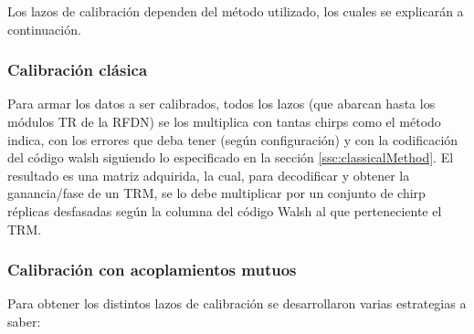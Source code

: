 Los lazos de calibración dependen del método utilizado, los cuales se explicarán a continuación.

\subsubsection{Calibración clásica}
Para armar los datos a ser calibrados, todos los lazos (que abarcan hasta los módulos TR de la RFDN) se los multiplica con 
tantas chirps como el método indica, con los errores que deba tener (según configuración) y con la codificación del código 
walsh siguiendo lo especificado en la sección \ref{ssc:classicalMethod}. El resultado es una matriz adquirida, la cual, para
decodificar y obtener la ganancia/fase de un TRM, se lo debe multiplicar por un conjunto de chirp réplicas desfasadas según la 
columna del código Walsh al que perteneciente el TRM. 

\subsubsection{Calibración con acoplamientos mutuos}

Para obtener los distintos lazos de calibración se desarrollaron varias estrategias a saber: 


